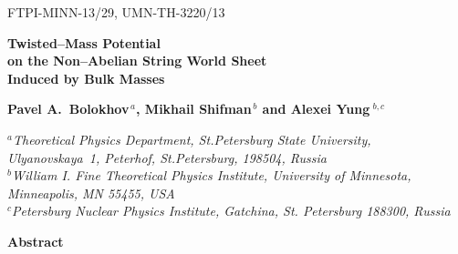 \documentclass[12pt]{article}
\begin{document}
\begin{titlepage}


\begin{flushright}
FTPI-MINN-13/29, UMN-TH-3220/13\\
\end{flushright}


\vspace{1.6cm}
\begin{center}
{\Large \bf  Twisted--Mass Potential \\
	on the Non--Abelian String World Sheet \\[2.4mm]
             Induced by Bulk Masses}
\end{center}



\vspace{2mm}

\begin{center}

 {\large
 \bf   Pavel A.~Bolokhov$^{\,a}$,  Mikhail Shifman$^{\,b}$ and \bf Alexei Yung$^{\,\,b,c}$}
\end {center}

\begin{center}

$^a${\it Theoretical Physics Department, St.Petersburg State University, Ulyanovskaya~1, 
	 Peterhof, St.Petersburg, 198504, Russia}\\
$^b${\it  William I. Fine Theoretical Physics Institute,
University of Minnesota,
Minneapolis, MN 55455, USA}\\
$^c${\it Petersburg Nuclear Physics Institute, Gatchina, St. Petersburg
188300, Russia
}
\end{center}



\vspace{1cm}
\begin{center}
{\large\bf Abstract}
\end{center}


\end{titlepage}
\end{document}
